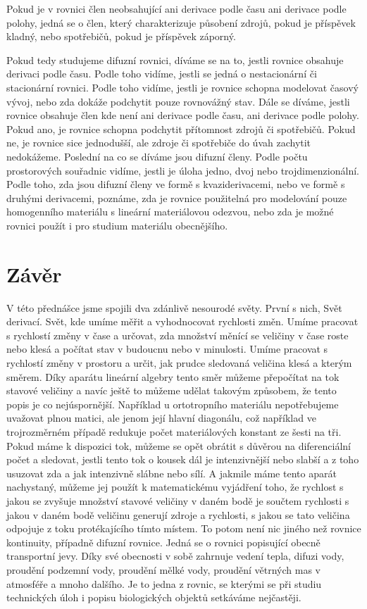 \documentclass[12pt]{article}
\begin{document}
Pokud je v rovnici člen neobsahující ani derivace podle času ani derivace podle polohy, jedná se o člen, který charakterizuje působení zdrojů, pokud je příspěvek kladný, nebo spotřebičů, pokud je příspěvek záporný.

Pokud tedy studujeme difuzní rovnici, díváme se na to, jestli rovnice obsahuje derivaci podle času. Podle toho vidíme, jestli se jedná o nestacionární či stacionární rovnici. Podle toho vidíme, jestli je rovnice schopna modelovat časový vývoj, nebo zda dokáže podchytit pouze rovnovážný stav. Dále se díváme, jestli rovnice obsahuje člen kde není ani derivace podle času, ani derivace podle polohy. Pokud ano, je rovnice schopna podchytit přítomnost zdrojů či spotřebičů. Pokud ne, je rovnice sice jednodušší, ale zdroje či spotřebiče do úvah zachytit nedokážeme. Poslední na co se díváme jsou difuzní členy. Podle počtu prostorových souřadnic vidíme, jestli je úloha jedno, dvoj nebo trojdimenzionální. Podle toho, zda jsou difuzní členy ve formě s kvaziderivacemi, nebo ve formě s druhými derivacemi, poznáme, zda je rovnice použitelná pro modelování pouze homogenního materiálu s lineární materiálovou odezvou, nebo zda je možné rovnici použít i pro studium materiálu obecnějšího. 

\section{Závěr}

V této přednášce jsme spojili dva zdánlivě nesourodé světy. První s nich, Svět derivací. Svět, kde umíme měřit a vyhodnocovat rychlosti změn. Umíme pracovat s rychlostí změny v čase a určovat, zda množství měnící se veličiny v čase roste nebo klesá a počítat stav v budoucnu nebo v minulosti. Umíme pracovat s rychlostí změny v prostoru a určit, jak prudce sledovaná veličina klesá a kterým směrem. Díky aparátu lineární algebry tento směr můžeme přepočítat na tok stavové veličiny a navíc ještě to můžeme udělat takovým způsobem, že tento popis je co nejúspornější. Například u ortotropního materiálu nepotřebujeme uvažovat plnou matici, ale jenom její hlavní diagonálu, což například ve trojrozměrném případě redukuje počet materiálových konstant ze šesti na tři. Pokud máme k dispozici tok, můžeme se opět obrátit s důvěrou na diferenciální počet a sledovat, jestli tento tok o kousek dál je intenzivnější nebo slabší a z toho usuzovat zda a jak intenzivně slábne nebo sílí. A jakmile máme tento aparát nachystaný, můžeme jej použít k matematickému vyjádření toho, že rychlost s jakou se zvyšuje množství stavové veličiny v daném bodě je součtem rychlosti s jakou v daném bodě veličinu generují zdroje a rychlosti, s jakou se tato veličina odpojuje z toku protékajícího tímto místem. To potom není nic jiného než rovnice kontinuity, případně difuzní rovnice. Jedná se o rovnici popisující obecně transportní jevy. Díky své obecnosti v sobě zahrnuje vedení tepla, difuzi vody, proudění podzemní vody, proudění mělké vody, proudění větrných mas v atmosféře a mnoho dalšího. Je to jedna z rovnic, se kterými se při studiu technických úloh i popisu biologických objektů setkáváme nejčastěji.
\end{document}
